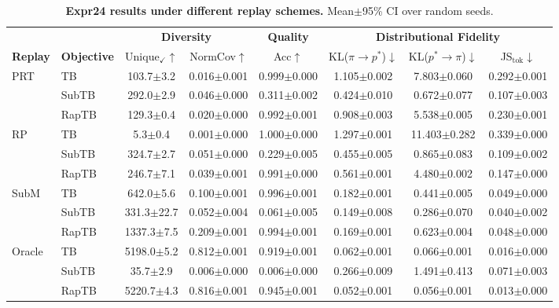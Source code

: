\documentclass{article}
\theoremstyle{plain}
\theoremstyle{definition}
\theoremstyle{remark}
\begin{document}
\begin{table}[t]
\centering
\scriptsize
\setlength{\tabcolsep}{3.5pt}
\renewcommand{\arraystretch}{1.1}
\caption{\textbf{Expr24 results under different replay schemes.} Mean$\pm$95\% CI over random seeds.}
\label{tab:expr24_main}
\begin{tabular}{llcccccc}
\toprule
& & \multicolumn{2}{c}{\textbf{Diversity}} & \textbf{Quality} & \multicolumn{3}{c}{\textbf{Distributional Fidelity}} \\
\cmidrule(lr){3-4} \cmidrule(lr){5-5} \cmidrule(lr){6-8}
\textbf{Replay} & \textbf{Objective} & Unique$_\checkmark$$\uparrow$ & NormCov$\uparrow$ & Acc$\uparrow$ &
KL($\pi\!\to\!p^*$)$\downarrow$ & KL($p^*\!\to\!\pi$)$\downarrow$ & JS$_{\text{tok}}$$\downarrow$ \\
\midrule
\multirow{3}{*}{\centering PRT}
& TB    & 103.7$\pm$3.2 & 0.016$\pm$0.001 & 0.999$\pm$0.000 & 1.105$\pm$0.002 & 7.803$\pm$0.060 & 0.292$\pm$0.001 \\
& SubTB & 292.0$\pm$2.9 & 0.046$\pm$0.000 & 0.311$\pm$0.002 & 0.424$\pm$0.010 & 0.672$\pm$0.077 & 0.107$\pm$0.003 \\
& RapTB & 129.3$\pm$0.4 & 0.020$\pm$0.000 & 0.992$\pm$0.001 & 0.908$\pm$0.003 & 5.538$\pm$0.005 & 0.230$\pm$0.001 \\
\midrule
\multirow{3}{*}{\centering RP}
& TB    & 5.3$\pm$0.4 & 0.001$\pm$0.000 & 1.000$\pm$0.000 & 1.297$\pm$0.001 & 11.403$\pm$0.282 & 0.339$\pm$0.000 \\
& SubTB & 324.7$\pm$2.7 & 0.051$\pm$0.000 & 0.229$\pm$0.005 & 0.455$\pm$0.005 & 0.865$\pm$0.083 & 0.109$\pm$0.002 \\
& RapTB & 246.7$\pm$7.1 & 0.039$\pm$0.001 & 0.991$\pm$0.000 & 0.561$\pm$0.001 & 4.480$\pm$0.002 & 0.147$\pm$0.000 \\
\midrule
\multirow{3}{*}{\centering SubM}
& TB    & 642.0$\pm$5.6 & 0.100$\pm$0.001 & 0.996$\pm$0.001 & 0.182$\pm$0.001 & 0.441$\pm$0.005 & 0.049$\pm$0.000 \\
& SubTB & 331.3$\pm$22.7 & 0.052$\pm$0.004 & 0.061$\pm$0.005 & 0.149$\pm$0.008 & 0.286$\pm$0.070 & 0.040$\pm$0.002 \\
& RapTB & 1337.3$\pm$7.5 & 0.209$\pm$0.001 & 0.994$\pm$0.001 & 0.169$\pm$0.001 & 0.623$\pm$0.004 & 0.048$\pm$0.000 \\
\midrule
\multirow{3}{*}{\centering Oracle}
& TB    & 5198.0$\pm$5.2 & 0.812$\pm$0.001 & 0.919$\pm$0.001 & 0.062$\pm$0.001 & 0.066$\pm$0.001 & 0.016$\pm$0.000 \\
& SubTB & 35.7$\pm$2.9 & 0.006$\pm$0.000 & 0.006$\pm$0.000 & 0.266$\pm$0.009 & 1.491$\pm$0.413 & 0.071$\pm$0.003 \\
& RapTB & 5220.7$\pm$4.3 & 0.816$\pm$0.001 & 0.945$\pm$0.001 & 0.052$\pm$0.001 & 0.056$\pm$0.001 & 0.013$\pm$0.000 \\
\bottomrule
\end{tabular}
\end{table}
\end{document}
